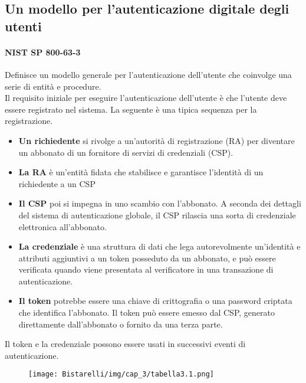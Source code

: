 \newpage
\subsection{Un modello per l'autenticazione digitale degli utenti}
\paragraph{NIST SP 800-63-3} 
Definisce un modello generale per l'autenticazione dell'utente che coinvolge una serie di entità e procedure.
\\
Il requisito iniziale per eseguire l'autenticazione dell'utente è che l'utente deve essere registrato nel sistema. La seguente è una tipica sequenza per la registrazione. 

\begin{itemize}
    \item \textbf{Un richiedente} si rivolge a un'autorità di registrazione (RA) per diventare un abbonato di un fornitore di servizi di credenziali (CSP).
    
     \item \textbf{La RA} è un'entità fidata che stabilisce e garantisce l'identità di un richiedente a un CSP
     
     \item \textbf{Il CSP} poi si impegna in uno scambio con l'abbonato. A seconda dei dettagli del sistema di autenticazione globale, il CSP rilascia una sorta di credenziale elettronica all'abbonato.
     
     \item \textbf{La credenziale} è una struttura di dati che lega autorevolmente un'identità e attributi aggiuntivi a un token posseduto da un abbonato, e può essere verificata quando viene presentata al verificatore in una transazione di autenticazione.
     
     \item \textbf{Il token} potrebbe essere una chiave di crittografia o una password criptata che identifica l'abbonato. Il token può essere emesso dal CSP, generato direttamente dall'abbonato o fornito da una terza parte.
\end{itemize}

Il token e la credenziale possono essere usati in successivi eventi di autenticazione.

\begin{figure}[H]
	\centering
    \texttt{[image: Bistarelli/img/cap\_3/tabella3.1.png]}
\end{figure}

